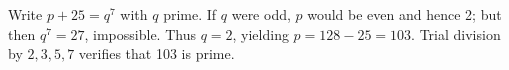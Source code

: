 Write $p+25=q^7$ with $q$ prime. If $q$ were odd, $p$ would be even and hence 2; but then $q^7=27$, impossible. Thus $q=2$, yielding $p=128-25=\boxed{103}$. Trial division by $2,3,5,7$ verifies that 103 is prime.
